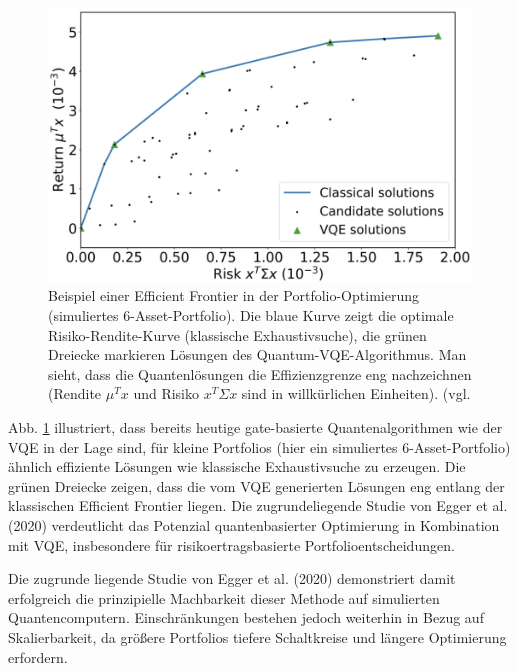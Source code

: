 \begin{figure}
    \centering
    \includegraphics[width=0.8\linewidth]{EfficientFrontier_VQE.png}
    \caption{Beispiel einer Efficient Frontier in der Portfolio-Optimierung (simuliertes 6-Asset-Portfolio). Die blaue Kurve zeigt die optimale Risiko-Rendite-Kurve (klassische Exhaustivsuche), die grünen Dreiecke markieren Lösungen des Quantum-VQE-Algorithmus. Man sieht, dass die Quantenlösungen die Effizienzgrenze eng nachzeichnen (Rendite $\mu^T x$ und Risiko $x^T \Sigma x$ sind in willkürlichen Einheiten). (vgl. \cite[Abb. 8]{egger_quantum_2020}}
    \label{fig:efficient_frontier_vqe}
\end{figure}


Abb. \ref{fig:efficient_frontier_vqe} illustriert, dass bereits heutige gate-basierte Quantenalgorithmen wie der VQE in der Lage sind, für kleine Portfolios (hier ein simuliertes 6-Asset-Portfolio) ähnlich effiziente Lösungen wie klassische Exhaustivsuche zu erzeugen. Die grünen Dreiecke zeigen, dass die vom VQE generierten Lösungen eng entlang der klassischen Efficient Frontier liegen. Die zugrundeliegende Studie von Egger et al. (2020) verdeutlicht das Potenzial quantenbasierter Optimierung in Kombination mit VQE, insbesondere für risikoertragsbasierte Portfolioentscheidungen. 

Die zugrunde liegende Studie von Egger et al. (2020) demonstriert damit erfolgreich die prinzipielle Machbarkeit dieser Methode auf simulierten Quantencomputern. Einschränkungen bestehen jedoch weiterhin in Bezug auf Skalierbarkeit, da größere Portfolios tiefere Schaltkreise und längere Optimierung erfordern.
 
